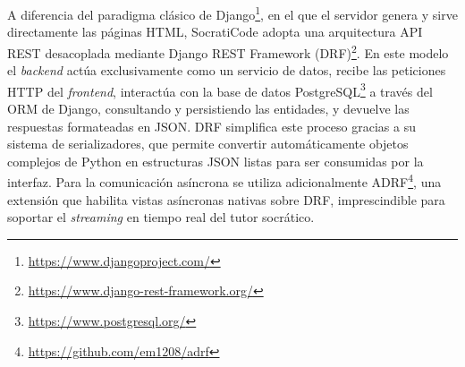 A diferencia del paradigma clásico de Django\footnote{\url{https://www.djangoproject.com/}}, en el que el servidor genera y sirve directamente las páginas HTML, SocratiCode adopta una arquitectura API REST desacoplada mediante Django REST Framework (DRF)\footnote{\url{https://www.django-rest-framework.org/}}. En este modelo el \textit{backend} actúa exclusivamente como un servicio de datos, recibe las peticiones HTTP del \textit{frontend}, interactúa con la base de datos PostgreSQL\footnote{\url{https://www.postgresql.org/}} a través del ORM de Django, consultando y persistiendo las entidades, y devuelve las respuestas formateadas en JSON. DRF simplifica este proceso gracias a su sistema de serializadores, que permite convertir automáticamente objetos complejos de Python en estructuras JSON listas para ser consumidas por la interfaz. Para la comunicación asíncrona se utiliza adicionalmente ADRF\footnote{\url{https://github.com/em1208/adrf}}, una extensión que habilita vistas asíncronas nativas sobre DRF, imprescindible para soportar el \textit{streaming} en tiempo real del tutor socrático.